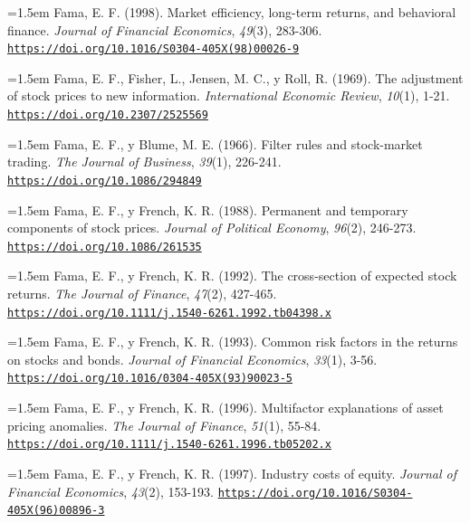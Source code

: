 \documentclass[10pt,a4paper]{article}
\begin{document}
\noindent\hangindent=1.5em Fama, E. F. (1998). Market efficiency, long-term returns, and behavioral finance. \textit{Journal of Financial Economics}, \textit{49}(3), 283-306. \href{https://doi.org/10.1016/S0304-405X(98)00026-9}{\nolinkurl{https://doi.org/10.1016/S0304-405X(98)00026-9}}

\noindent\hangindent=1.5em Fama, E. F., Fisher, L., Jensen, M. C., y Roll, R. (1969). The adjustment of stock prices to new information. \textit{International Economic Review}, \textit{10}(1), 1-21. \href{https://doi.org/10.2307/2525569}{\nolinkurl{https://doi.org/10.2307/2525569}}

\noindent\hangindent=1.5em Fama, E. F., y Blume, M. E. (1966). Filter rules and stock-market trading. \textit{The Journal of Business}, \textit{39}(1), 226-241. \href{https://doi.org/10.1086/294849}{\nolinkurl{https://doi.org/10.1086/294849}}

\noindent\hangindent=1.5em Fama, E. F., y French, K. R. (1988). Permanent and temporary components of stock prices. \textit{Journal of Political Economy}, \textit{96}(2), 246-273. \href{https://doi.org/10.1086/261535}{\nolinkurl{https://doi.org/10.1086/261535}}

\noindent\hangindent=1.5em Fama, E. F., y French, K. R. (1992). The cross-section of expected stock returns. \textit{The Journal of Finance}, \textit{47}(2), 427-465. \href{https://doi.org/10.1111/j.1540-6261.1992.tb04398.x}{\nolinkurl{https://doi.org/10.1111/j.1540-6261.1992.tb04398.x}}

\noindent\hangindent=1.5em Fama, E. F., y French, K. R. (1993). Common risk factors in the returns on stocks and bonds. \textit{Journal of Financial Economics}, \textit{33}(1), 3-56. \href{https://doi.org/10.1016/0304-405X(93)90023-5}{\nolinkurl{https://doi.org/10.1016/0304-405X(93)90023-5}}

\noindent\hangindent=1.5em Fama, E. F., y French, K. R. (1996). Multifactor explanations of asset pricing anomalies. \textit{The Journal of Finance}, \textit{51}(1), 55-84. \href{https://doi.org/10.1111/j.1540-6261.1996.tb05202.x}{\nolinkurl{https://doi.org/10.1111/j.1540-6261.1996.tb05202.x}}

\noindent\hangindent=1.5em Fama, E. F., y French, K. R. (1997). Industry costs of equity. \textit{Journal of Financial Economics}, \textit{43}(2), 153-193. \href{https://doi.org/10.1016/S0304-405X(96)00896-3}{\nolinkurl{https://doi.org/10.1016/S0304-405X(96)00896-3}}
\end{document}
